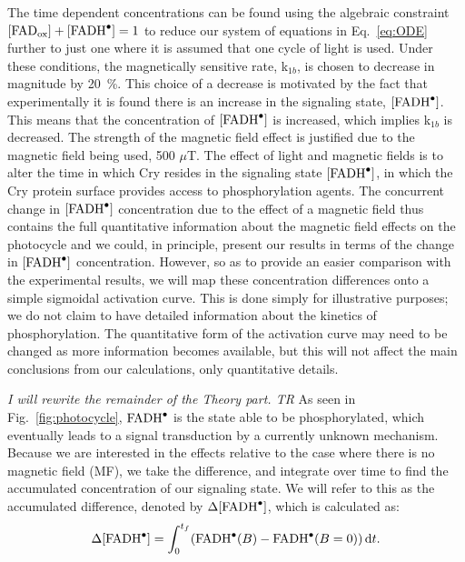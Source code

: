 \documentclass[twoside,twocolumn,9pt]{article}
\begin{document}
The time dependent concentrations can be found using the algebraic constraint $[\text{FAD}_{\text{ox}}] + [\ce{FADH^{.}}] = 1$ to reduce our system of equations in Eq.~\ref{eq:ODE} further to just one where it is assumed that one cycle of light is used. Under these conditions, the magnetically sensitive rate, k$_{1b}$, is chosen to decrease in magnitude by 20~\%. This choice of a decrease is motivated \cite{Hammad2019} by the fact that experimentally it is found there is an increase in the signaling state, $ [\ce{FADH^{.}}]$. This means that the concentration of $[\ce{FADH^{.}}]$ is increased, which implies k$_{1b}$ is decreased. The strength of the magnetic field effect is justified due to the magnetic field being used, \cite{Pooam2019, Hammad2019} 500 $\mu$T.
The effect of light and magnetic fields is to alter the time in which Cry resides in the signaling state $[\ce{FADH^{.}}]$, in which the Cry protein surface provides access to phosphorylation agents. The concurrent change in $[\ce{FADH^{.}}]$ concentration due to the effect of a magnetic field thus contains the full quantitative information about the magnetic field effects on the photocycle and we could, in principle, present our results in terms of the change in $[\ce{FADH^{.}}]$ concentration.
However, so as to provide an easier comparison with the experimental results, we will map these concentration differences onto a simple sigmoidal activation curve. This is done simply for illustrative purposes; we do not claim to have detailed information about the kinetics of phosphorylation. The quantitative form of the activation curve may need to be changed as more information becomes available, but this will not affect the main conclusions from our calculations, only quantitative details.

{\em I will rewrite the remainder of the Theory part. TR}
As seen in Fig.~\ref{fig:photocycle}, $\ce{FADH^{.}}$ is the state able to be phosphorylated, which eventually leads to a signal transduction by a currently unknown mechanism. Because we are interested in the effects relative to the case where there is no magnetic field (MF), we take the difference, and integrate over time to find the accumulated concentration of our signaling state. We will refer to this as the accumulated difference, denoted by $\Delta [\ce{FADH^{.}}]$, which is calculated as:
\begin{equation}
	\Delta [\ce{FADH^{.}}] = \int_{0}^{t_{f}} (\ce{FADH^{.}}(B) - \ce{FADH^{.}}(B = 0)) \, \mathrm{d}t.
\end{equation}
\end{document}
